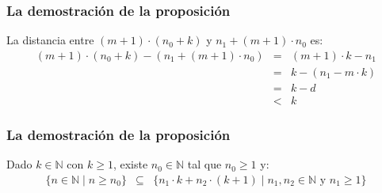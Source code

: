 \begin{frame}
\frametitle{La demostración de la proposición}

{\small

La distancia entre $(m+1) \cdot (n_0 + k)$ y $n_1 + (m+1) \cdot n_0$ es:
\begin{eqnarray*}
(m+1) \cdot (n_0 + k) - (n_1 + (m+1) \cdot n_0) &=& (m+1) \cdot k - n_1\\
&=& k - (n_1 - m \cdot k)\\
&=& k - d\\
& < & k
\end{eqnarray*}



}

\end{frame}

\begin{frame}
\frametitle{La demostración de la proposición}

{\small

\begin{lema}
Dado $k \in \mathbb{N}$ con $k \geq 1$, existe $n_0 \in \mathbb{N}$ tal que $n_0 \geq 1$ y:
\begin{eqnarray*}
\{ n \in \mathbb{N} \mid n \geq n_0\} & \subseteq & \{ n_1 \cdot k + n_2 \cdot (k + 1) \mid n_1, n_2 \in \mathbb{N} \text{ y } n_1 \geq 1 \}
\end{eqnarray*}
\end{lema}



}

\end{frame}

